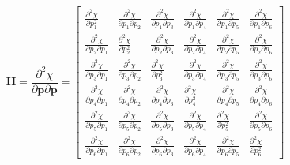 \begin{equation}
	\label{eq: hessian}
	\bm{H}=\frac{\partial^2 \chi}{\partial \bm{p} \partial \bm{p}}=\begin{bmatrix}
	\frac{\partial^2 \chi}{\partial p_1^2} &
	\frac{\partial^2 \chi}{\partial p_1 \partial p_2} &
	\frac{\partial^2 \chi}{\partial p_1 \partial p_3} &
	\frac{\partial^2 \chi}{\partial p_1 \partial p_4} &
	\frac{\partial^2 \chi}{\partial p_1 \partial p_5} &
	\frac{\partial^2 \chi}{\partial p_1 \partial p_6} \\
	\frac{\partial^2 \chi}{\partial p_2 \partial p_1} &
	\frac{\partial^2 \chi}{\partial p_2^2} &
	\frac{\partial^2 \chi}{\partial p_2 \partial p_3} &
	\frac{\partial^2 \chi}{\partial p_2 \partial p_4} &
	\frac{\partial^2 \chi}{\partial p_2 \partial p_5} &
	\frac{\partial^2 \chi}{\partial p_2 \partial p_6} \\
	\frac{\partial^2 \chi}{\partial p_3 \partial p_1} &
	\frac{\partial^2 \chi}{\partial p_3 \partial p_2} &
	\frac{\partial^2 \chi}{\partial p_3^2} &
	\frac{\partial^2 \chi}{\partial p_3 \partial p_4} &
	\frac{\partial^2 \chi}{\partial p_3 \partial p_5} &
	\frac{\partial^2 \chi}{\partial p_3 \partial p_6} \\
	\frac{\partial^2 \chi}{\partial p_4 \partial p_1} &
	\frac{\partial^2 \chi}{\partial p_4 \partial p_2} &
	\frac{\partial^2 \chi}{\partial p_4 \partial p_3} &
	\frac{\partial^2 \chi}{\partial p_4^2} &
	\frac{\partial^2 \chi}{\partial p_4 \partial p_5} &
	\frac{\partial^2 \chi}{\partial p_4 \partial p_6} \\
	\frac{\partial^2 \chi}{\partial p_5 \partial p_1} &
	\frac{\partial^2 \chi}{\partial p_5 \partial p_2} &
	\frac{\partial^2 \chi}{\partial p_5 \partial p_3} &
	\frac{\partial^2 \chi}{\partial p_5 \partial p_4} &
	\frac{\partial^2 \chi}{\partial p_5^2} &
	\frac{\partial^2 \chi}{\partial p_5 \partial p_6} \\
	\frac{\partial^2 \chi}{\partial p_6 \partial p_1} &
	\frac{\partial^2 \chi}{\partial p_6 \partial p_2} &
	\frac{\partial^2 \chi}{\partial p_6 \partial p_3} &
	\frac{\partial^2 \chi}{\partial p_6 \partial p_4} &
	\frac{\partial^2 \chi}{\partial p_6 \partial p_5} &
	\frac{\partial^2 \chi}{\partial p_6^2} 
	\end{bmatrix}
\end{equation}

